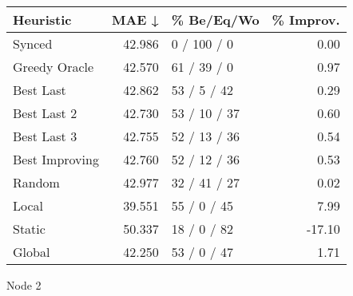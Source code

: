\begin{tabular}{lrlr}
\toprule
\textbf{Heuristic} & \textbf{MAE ↓} & \textbf{\% Be/Eq/Wo} & \textbf{\% Improv.} \\
\midrule
            Synced &         42.986 &          0 / 100 / 0 &                0.00 \\
     Greedy Oracle &         42.570 &          61 / 39 / 0 &                0.97 \\
         Best Last &         42.862 &          53 / 5 / 42 &                0.29 \\
       Best Last 2 &         42.730 &         53 / 10 / 37 &                0.60 \\
       Best Last 3 &         42.755 &         52 / 13 / 36 &                0.54 \\
    Best Improving &         42.760 &         52 / 12 / 36 &                0.53 \\
            Random &         42.977 &         32 / 41 / 27 &                0.02 \\
             Local &         39.551 &          55 / 0 / 45 &                7.99 \\
            Static &         50.337 &          18 / 0 / 82 &              -17.10 \\
            Global &         42.250 &          53 / 0 / 47 &                1.71 \\
\bottomrule
\end{tabular}
\caption{Node 2}
\label{tab:iid_lr01_le2_bs2_2}
